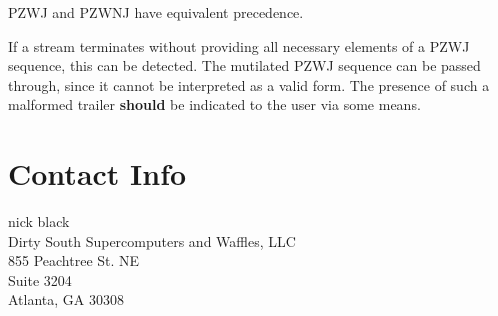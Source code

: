 \documentclass[letterpaper,10pt]{article}
\begin{document}
PZWJ and PZWNJ have equivalent precedence.

If a stream terminates without providing all necessary elements of a PZWJ
sequence, this can be detected. The mutilated PZWJ sequence can be passed
through, since it cannot be interpreted as a valid form. The presence of
such a malformed trailer \textbf{should} be indicated to the user via some
means.

\section{Contact Info}
nick black\\
Dirty South Supercomputers and Waffles, LLC\\
855 Peachtree St. NE\\
Suite 3204\\
Atlanta, GA 30308


\printbibliography
{}
\cleardoublepage
\end{document}
